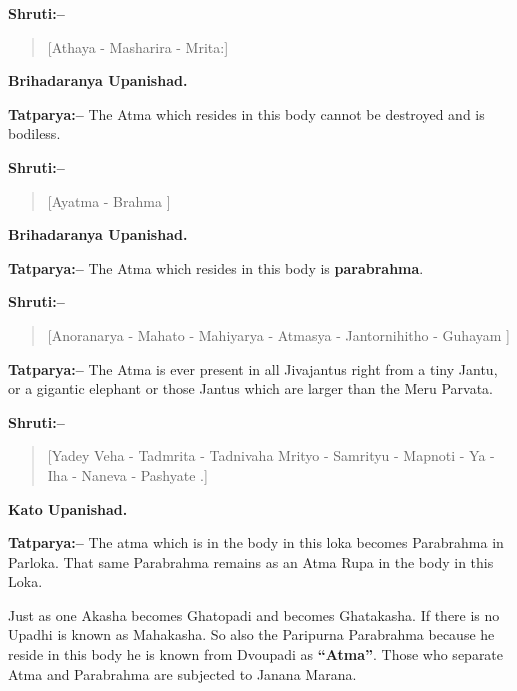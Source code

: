 \textbf{Shruti:–}

\begin{verse}
[Athaya - Masharira - Mrita:]
\end{verse}

\begin{flushright}
\textbf{Brihadaranya Upanishad.}
\end{flushright}

\textbf{Tatparya:–} The Atma which resides in this body cannot be destroyed and is bodiless.

\textbf{Shruti:–}

\begin{verse}
[Ayatma - Brahma ]
\end{verse}

\begin{flushright}
\textbf{Brihadaranya Upanishad.}
\end{flushright}

\textbf{Tatparya:–} The Atma which resides in this body is \textbf{parabrahma}.

\newpage

\textbf{Shruti:–}

\begin{verse}
[Anoranarya - Mahato - Mahiyarya - Atmasya - Jantornihitho - Guhayam ]
\end{verse}

\textbf{Tatparya:–} The Atma is ever present in all Jivajantus right from a tiny Jantu, or a gigantic elephant or those Jantus which are larger than the Meru Parvata.

\textbf{Shruti:–}

\begin{verse}
[Yadey Veha - Tadmrita - Tadnivaha Mrityo - Samrityu - Mapnoti - Ya - Iha - Naneva - Pashyate .]
\end{verse}

\begin{flushright}
\textbf{Kato Upanishad.}
\end{flushright}

\textbf{Tatparya:–} The atma which is in the body in this loka becomes Parabrahma in Parloka. That same Parabrahma remains as an Atma Rupa in the body in this Loka.

Just as one Akasha becomes Ghatopadi and becomes Ghatakasha. If there is no Upadhi is known as Mahakasha. So also the Paripurna Parabrahma because he reside in this body he is known from Dvoupadi as \textbf{“Atma”}. Those who separate Atma and Parabrahma are subjected to Janana Marana.

